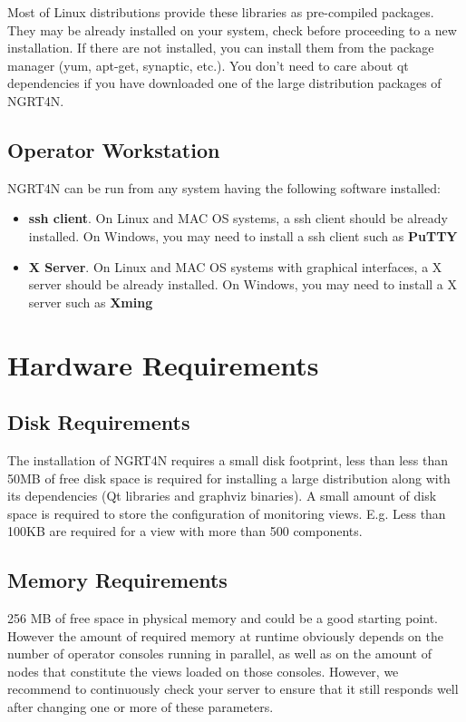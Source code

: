 \documentclass[a4paper,9pt]{article}
\begin{document}
Most of Linux distributions provide these libraries as pre-compiled packages. They may be already installed on your system, check before proceeding to a new installation. If there are not installed, you can install them from the package manager (yum, apt-get, synaptic, etc.).  
You don't need to care about qt dependencies if you have downloaded one of the large distribution packages of NGRT4N.

\subsection{Operator Workstation}
NGRT4N can be run from any system having the following software installed:
\begin{itemize}
\item {\bf ssh client}. On Linux and MAC OS systems, a ssh client should be already installed. On Windows, you may need to install a ssh client such as {\bf PuTTY}
\item {\bf X Server}. On Linux and MAC OS systems with graphical interfaces, a X server should be already installed. On Windows, you may need to install a X server such as {\bf Xming}
\end{itemize}

\section{Hardware Requirements}
\subsection{Disk Requirements}
The installation of NGRT4N requires a small disk footprint, less than less than 50MB of free disk space is required for installing a large distribution along with its dependencies (Qt libraries and graphviz binaries). A small amount of disk space is required to store the configuration of monitoring views. E.g. Less than 100KB are required for a view with more than 500 components. 

\subsection{Memory Requirements}
256 MB of free space in physical memory and could be a good starting point. However the amount of required memory at runtime obviously depends on the number of operator consoles running in parallel, as well as on the amount of nodes that constitute the views loaded on those consoles. However, we recommend to continuously check your server to ensure that it still responds well after changing one or more of these parameters.
\end{document}

